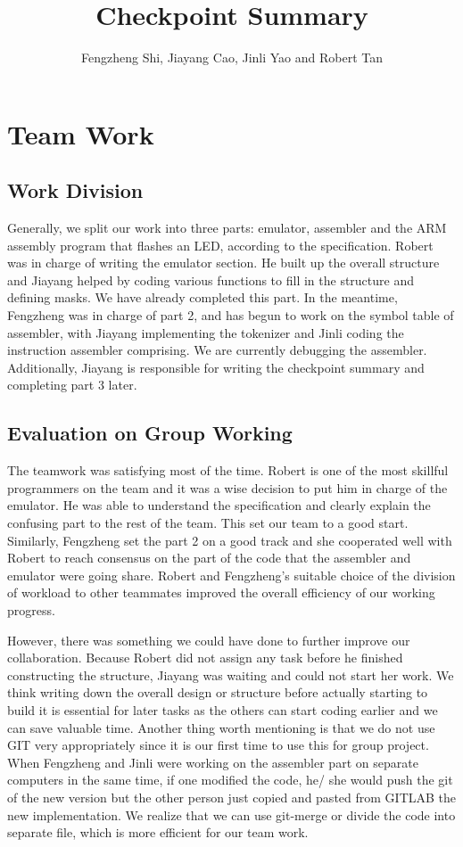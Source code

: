 \documentclass[11pt]{article}
\begin{document}
\title{Checkpoint Summary}
\author{Fengzheng Shi, Jiayang Cao, Jinli Yao and Robert Tan}

\maketitle

\section{Team Work}

\subsection{Work Division}
Generally, we split our work into three parts: emulator, assembler and the ARM assembly program that flashes an LED, according to the specification. Robert was in charge of writing the emulator section. He built up the overall structure and Jiayang helped by coding various functions to fill in the structure and defining masks. We have already completed this part. In the meantime, Fengzheng was in charge of part 2, and has begun to work on the symbol table of assembler, with Jiayang implementing the tokenizer and Jinli coding the instruction assembler comprising. We are currently debugging the assembler. Additionally, Jiayang is responsible for writing the checkpoint summary and completing part 3 later. 

\subsection{Evaluation on Group Working}
The teamwork was satisfying most of the time. Robert is one of the most skillful programmers on the team and it was a wise decision to put him in charge of the emulator. He was able to understand the specification and clearly explain the confusing part to the rest of the team. This set our team to a good start. Similarly, Fengzheng set the part 2 on a good track and she cooperated well with Robert to reach consensus on the part of the code that the assembler and emulator were going share. Robert and Fengzheng's suitable choice of the division of workload to other teammates improved the overall efficiency of our working progress.\newline

\noindent
However, there was something we could have done to further improve our collaboration. Because Robert did not assign any task before he finished constructing the structure, Jiayang was waiting and could not start her work. We think writing down the overall design or structure before actually starting to build it is essential for later tasks as the others can start coding earlier and we can save valuable time. Another thing worth mentioning is that we do not use GIT very appropriately since it is our first time to use this for group project. When Fengzheng and Jinli were working on the assembler part on separate computers in the same time, if one modified the code, he/ she would push the git of the new version but the other person just copied and pasted from GITLAB the new implementation. We realize that we can use git-merge or divide the code into separate file, which is more efficient for our team work.
\end{document}
